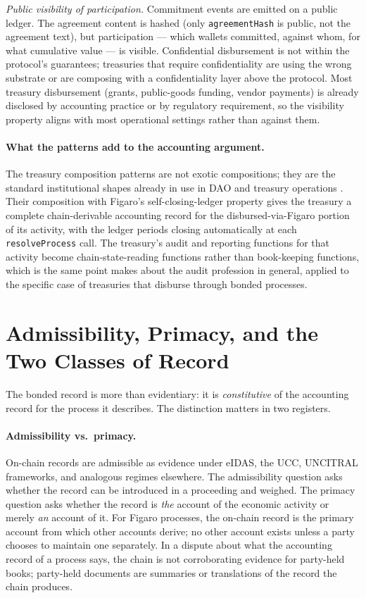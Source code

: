 \documentclass[11pt,a4paper]{article}
\theoremstyle{definition}
\theoremstyle{remark}
\begin{document}
\emph{Public visibility of participation.} Commitment events
are emitted on a public ledger. The agreement content is hashed
(only \texttt{agreementHash} is public, not the agreement text),
but participation --- which wallets committed, against whom, for
what cumulative value --- is visible. Confidential disbursement
is not within the protocol's guarantees; treasuries that require
confidentiality are using the wrong substrate or are composing
with a confidentiality layer above the protocol. Most treasury
disbursement (grants, public-goods funding, vendor payments) is
already disclosed by accounting practice or by regulatory
requirement, so the visibility property aligns with most
operational settings rather than against them.

\paragraph{What the patterns add to the accounting argument.}
The treasury composition patterns are not exotic compositions; they
are the standard institutional shapes already in use in DAO and
treasury operations \citep{messari_dao_treasury_2023,
deepdao_treasury_2024}. Their composition with Figaro's
self-closing-ledger property gives the treasury a complete
chain-derivable accounting record for the disbursed-via-Figaro
portion of its activity, with the ledger periods closing
automatically at each \texttt{resolveProcess} call. The
treasury's audit and reporting functions for that activity become
chain-state-reading functions rather than book-keeping functions,
which is the same point  makes about the
audit profession in general, applied to the specific case of
treasuries that disburse through bonded processes.

\section{Admissibility, Primacy, and the Two Classes of Record}
\label{sec:legal-connection}

The bonded record is more than evidentiary: it is
\emph{constitutive} of the accounting record for the process
it describes. The distinction matters in two registers.

\paragraph{Admissibility vs.\ primacy.}
On-chain records are admissible as evidence under eIDAS, the
UCC, UNCITRAL frameworks, and analogous regimes elsewhere.
The admissibility question asks whether the record can be
introduced in a proceeding and weighed. The primacy question
asks whether the record is \emph{the} account of the economic
activity or merely \emph{an} account of it. For Figaro
processes, the on-chain record is the primary account from
which other accounts derive; no other account exists unless a
party chooses to maintain one separately. In a dispute about
what the accounting record of a process says, the chain is
not corroborating evidence for party-held books; party-held
documents are summaries or translations of the record the
chain produces.
\end{document}
